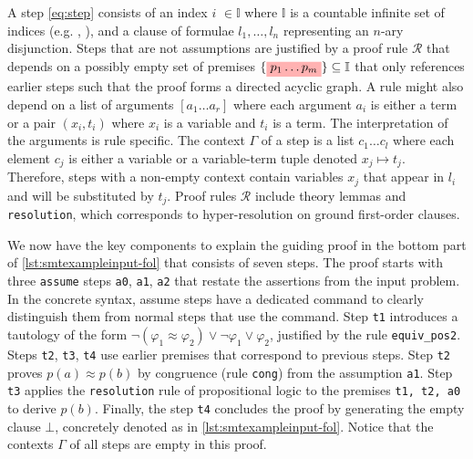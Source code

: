 A step \cref{eq:step} consists of an index \colorbox{indexClr!30}{$i$} $\in \mathbb{I}$ where $\mathbb{I}$ is a countable infinite set of indices (e.g. , ), and a clause of formulae \colorbox{green!30}{$l_1, \dots, l_n$} representing an $n$-ary disjunction.
Steps that are not assumptions are justified by a proof rule \colorbox{purple!30}{$\mathcal{R}$} that depends on a possibly empty set of premises $\{\colorbox{red!30}{$p_1 \dots  p_m$}\} \subseteq \mathbb{I}$ that only references earlier steps such that the proof forms
a directed acyclic graph. A rule might also depend on a list of arguments \colorbox{orange!30}{$[a_1 \dots a_r]$} where each argument $a_i$ is either a term or a pair $(x_i, t_i)$ where $x_i$ is a variable and $t_i$ is a term. The interpretation of the arguments is rule specific.
The context \colorbox{blue!30}{$\Gamma$} of a step is a list $c_1 \dots c_l $ where each element $c_j$ is either a variable or a variable-term tuple denoted $x_j \mapsto t_j$.
Therefore, steps with a non-empty context contain variables $x_j$ that appear in \colorbox{green!30}{$l_i$} and will be substituted by $t_j$.
Proof rules \colorbox{purple!30}{$\mathcal{R}$} include theory lemmas and \texttt{resolution}, which corresponds to hyper-resolution on ground first-order clauses.

We now have the key components to explain the guiding proof in the bottom part of \cref{lst:smtexampleinput-fol} that consists of seven steps. The proof starts with three \texttt{assume} steps \texttt{a0}, \texttt{a1}, \texttt{a2} that restate the assertions from the input problem.
In the concrete syntax, assume steps have a dedicated command  to clearly distinguish them from normal steps that use the  command.
Step \texttt{t1} introduces a tautology of the form $\neg (\varphi_1 \approx \varphi_2) \lor \neg \varphi_1 \lor \varphi_2$, justified by the rule \colorbox{purple!30}{\texttt{equiv\_pos2}}. Steps \texttt{t2}, \texttt{t3}, \texttt{t4} use earlier premises that correspond to previous steps.
Step \texttt{t2} proves $p(a) \approx p(b)$ by congruence (rule \colorbox{purple!30}{\texttt{cong}}) from the assumption \texttt{a1}.
Step \texttt{t3} applies the \colorbox{purple!30}{\texttt{resolution}} rule of propositional logic to the premises \texttt{t1, t2, a0} to derive $p(b)$. Finally, the step \texttt{t4} concludes the proof by generating the empty clause $\bot$, concretely denoted as  in \cref{lst:smtexampleinput-fol}. %
Notice that the contexts \colorbox{blue!30}{$\Gamma$} of all steps are empty in this proof.


